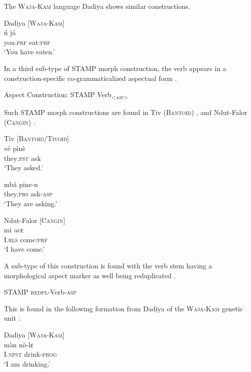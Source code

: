 \documentclass[output=paper]{langsci/langscibook}
\begin{document}
The \textsc{Waja-Kam} language Dadiya shows similar constructions.

\ea\label{ex:anderson:15}
Dadiya   \citep[196]{Jungraithmayr1968}       [\textsc{Waja-Kam]}  \\
\gll \'{n}    já    \\
you\textsc{.prf}  eat:\textsc{prf}    \\
\glt `You have eaten.'  
\z

In a third sub-type of STAMP morph construction, the verb appears in a construction-specific co-grammaticalized aspectual form . 

\ea\label{ex:anderson:16}
Aspect Construction:    STAMP  Verb\textsubscript{<\textsc{asp}>}    
\z

Such STAMP morph constructions are found in Tiv (\textsc{Bantoid}) , and Ndut-Falor (\textsc{Cangin}) .

\ea\label{ex:anderson:17}
\ea\label{ex:anderson:17a}
Tiv \citep[114]{Arnott1958}          \textsc{[Bantoid/Tivoid]}\\
\gll vé     pìnè        \\
  they\textsc{.pst}   ask          \textsc{}\\
\glt `They asked.'          

\ex \label{ex:anderson:17b}
\gll mbá       pi\textsuperscript{{\textbar}}ne-n  \\
  they.\textsc{prs}    ask-\textsc{asp}\\
\glt `They are asking.'      
\z
\z

\ea\label{ex:anderson:18}
Ndut-Falor \citep[Ndut-Falor 4]{Pichl1973}      [\textsc{Cangin}]\\
\gll mi    acɛ          \\
I.\textsc{rls}  come:\textsc{prf}\\
\glt `I have come.'  
\z

A sub-type of this construction is found with the verb stem having a morphological aspect marker as well being reduplicated . 

\ea\label{ex:anderson:19}
   STAMP  \textsc{redpl}-Verb-\textsc{asp} 
\z

This is found in the following formation from Dadiya of the \textsc{Waja-Kam} genetic unit :

\ea\label{ex:anderson:20}
Dadiya   \citep[197]{Jungraithmayr1968}        [\textsc{Waja-Kam}]\\
\ea\label{ex:anderson:20a}
\gll m\`ən  nò-lɛ\\
  I.\textsc{npst}  drink-\textsc{prog}        \\
\glt `I am drinking.'         
\end{document}
